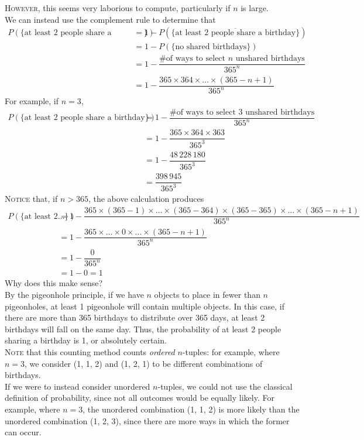 \documentclass{article}
\begin{document}
\textsc{However}, this seems very laborious to compute, particularly if $n$ is large.\\
We can instead use the complement rule to determine that
\begin{equation*}
\boxed{\begin{split}
P(\{\text{at least 2 people share a birthday}\})& =1-P(\{\overline{\text{at least 2 people share a birthday}}\})\\
& =1-P(\{\text{no shared birthdays}\})\\
& =1-\dfrac{\text{\# of ways to select $n$ unshared birthdays}}{365^n}\\
& =1-\dfrac{365\times 364\times\ldots\times(365-n+1)}{365^n}
\end{split}}
\end{equation*}
For example, if $n=3$, 
\begin{align*}
P(\{\text{at least 2 people share a birthday}\})
& =1-\dfrac{\text{\# of ways to select 3 unshared birthdays}}{365^n}\\
& =1-\dfrac{365\times 364\times 363}{365^3}\\
& =1-\dfrac{48\,228\,180}{365^3}\\
& =\dfrac{398\,945}{365^3}
\end{align*}
\textsc{Notice} that, if $n>365$, the above calculation produces
\begin{align*}
P(\{\text{at least 2\ldots}\})& =1-\dfrac{365\times(365-1)\times\ldots\times(365-364)\times(365-365)\times\ldots\times(365-n+1)}{365^n}\\
& =1-\dfrac{365\times\ldots\times 0\times\ldots\times(365-n+1)}{365^n}\\
& =1-\dfrac{0}{365^n}\\
& =1-0=1
\end{align*}
Why does this make sense?\\[1ex]
By the pigeonhole principle, if we have $n$ objects to place in fewer than $n$ pigeonholes, at least 1 pigeonhole will contain multiple objects. In this case, if there are more than 365 birthdays to distribute over 365 days, at least 2 birthdays will fall on the same day. Thus, the probability of at least 2 people sharing a birthday is 1, or absolutely certain.\\[1ex]
\textsc{Note} that this counting method counts \textit{ordered} $n$-tuples: for example, where $n=3$, we consider (1, 1, 2) and (1, 2, 1) to be different combinations of birthdays.\\
If we were to instead consider unordered $n$-tuples, we could not use the classical definition of probability, since not all outcomes would be equally likely. For example, where $n=3$, the unordered combination (1, 1, 2) is more likely than the unordered combination (1, 2, 3), since there are more ways in which the former can occur.
\end{document}
